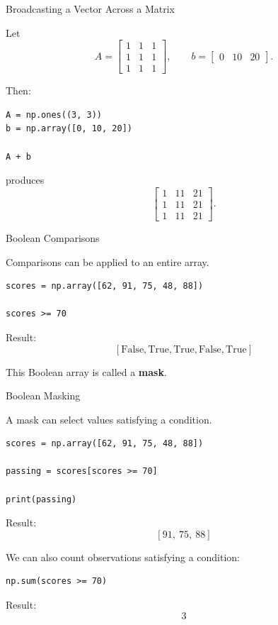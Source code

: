 \documentclass[11pt,aspectratio=43]{beamer}
\begin{document}
\begin{frame}[fragile]{Broadcasting a Vector Across a Matrix}

Let
\[
A =
\begin{bmatrix}
1&1&1\\
1&1&1\\
1&1&1
\end{bmatrix}
,\qquad
b =
\begin{bmatrix}
0&10&20
\end{bmatrix}.
\]

Then:
\begin{lstlisting}
A = np.ones((3, 3))
b = np.array([0, 10, 20])

A + b
\end{lstlisting}

produces
\[
\begin{bmatrix}
1&11&21\\
1&11&21\\
1&11&21
\end{bmatrix}.
\]

\end{frame}

\begin{frame}[fragile]{Boolean Comparisons}

Comparisons can be applied to an entire array.

\begin{lstlisting}
scores = np.array([62, 91, 75, 48, 88])

scores >= 70
\end{lstlisting}

Result:
\[
[
\text{False},
\text{True},
\text{True},
\text{False},
\text{True}
]
\]

This Boolean array is called a \textbf{mask}.

\end{frame}

\begin{frame}[fragile]{Boolean Masking}

A mask can select values satisfying a condition.

\begin{lstlisting}
scores = np.array([62, 91, 75, 48, 88])

passing = scores[scores >= 70]

print(passing)
\end{lstlisting}

Result:
\[
[91,\ 75,\ 88]
\]

We can also count observations satisfying a condition:
\begin{lstlisting}
np.sum(scores >= 70)
\end{lstlisting}

Result:
\[
3
\]

\end{frame}
\end{document}
